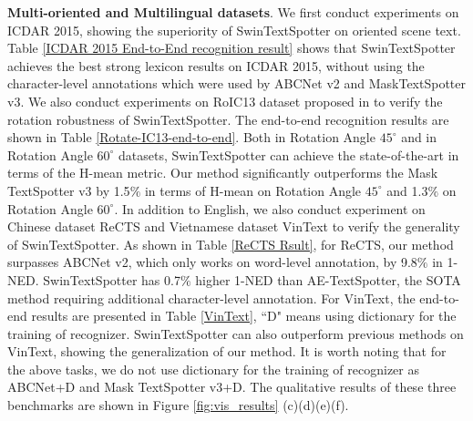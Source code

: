 \documentclass[10pt,twocolumn,letterpaper]{article}
\begin{document}
\textbf{Multi-oriented and Multilingual datasets}. We first conduct experiments on ICDAR 2015, showing the superiority of SwinTextSpotter on oriented scene text. Table \ref{ICDAR 2015 End-to-End recognition result} shows that SwinTextSpotter achieves the best strong lexicon results on ICDAR 2015, without using the character-level annotations which were used by ABCNet v2 and MaskTextSpotter v3. We also conduct experiments on RoIC13 dataset proposed in \cite{liao2020mask} to verify the rotation robustness of SwinTextSpotter. The end-to-end recognition results are shown in Table \ref{Rotate-IC13-end-to-end}. Both in Rotation Angle $45^{\circ}$ and in Rotation Angle $60^{\circ}$ datasets, SwinTextSpotter can achieve the state-of-the-art in terms of the H-mean metric. Our method significantly outperforms the Mask TextSpotter v3 by 1.5$\%$ in terms of  
H-mean on Rotation Angle $45^{\circ}$ and 1.3$\%$  on Rotation Angle $60^{\circ}$. In addition to English, we also conduct experiment on Chinese dataset ReCTS and Vietnamese dataset VinText to verify the generality of SwinTextSpotter. As shown in Table \ref{ReCTS Rsult}, for ReCTS, our method surpasses ABCNet v2, which only works on word-level annotation, by 9.8$\%$ in 1-NED.
SwinTextSpotter has 0.7$\%$ higher 1-NED than AE-TextSpotter, the SOTA method requiring additional character-level annotation. 
For VinText, the end-to-end results are presented in Table \ref{VinText}, ``D" means using dictionary for the training of recognizer. SwinTextSpotter can also outperform previous methods on VinText, showing the generalization of our method.
It is worth noting that for the above tasks, we do not use dictionary for the training of recognizer as ABCNet+D and Mask TextSpotter v3+D.
The qualitative results of these three benchmarks are shown in Figure \ref{fig:vis_results} (c)(d)(e)(f). 
\end{document}
